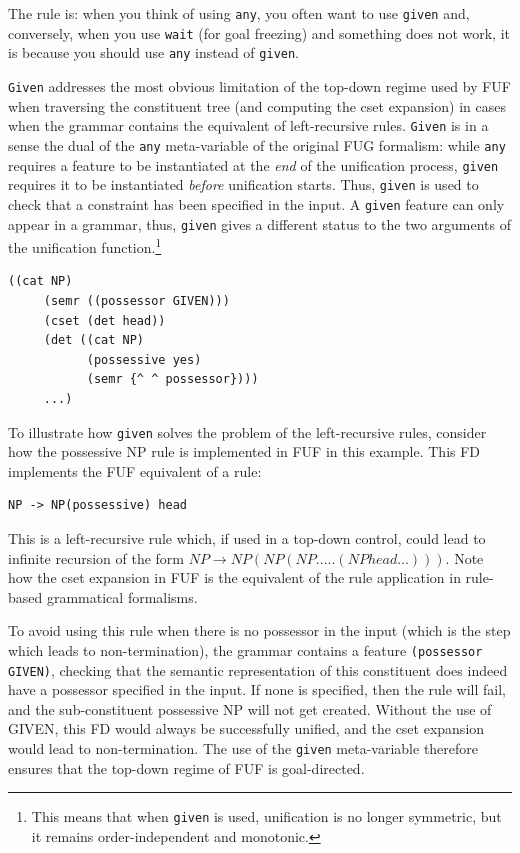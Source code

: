 \documentclass[10pt,a4paper]{report}
\begin{document}
The rule is: when you think of using {\tt any}, you often want to use
{\tt given} and, conversely, when you use {\tt wait} (for goal freezing) and
something does not work, it is because you should use {\tt any} instead of
{\tt given}.

{\tt Given} addresses the most obvious limitation of the top-down regime used
by FUF when traversing the constituent tree (and computing the cset
expansion) in cases when the grammar contains the equivalent of
left-recursive rules.  {\tt Given} is in a sense the dual of the {\tt any}
meta-variable of the original \textsc{FUG} formalism: while {\tt any} requires a
feature to be instantiated at the {\em end} of the unification process,
{\tt given} requires it to be instantiated {\em before} unification starts.
Thus, {\tt given} is used to check that a constraint has been specified in
the input.  A {\tt given} feature can only appear in a grammar, thus,
{\tt given} gives a different status to the two arguments of the unification
function.\footnote{This means that when {\tt given} is used, unification is no
longer symmetric, but it remains order-independent and monotonic.}

\begin{lstlisting}[language=Lisp]
	((cat NP)
	 (semr ((possessor GIVEN)))
	 (cset (det head))
	 (det ((cat NP)
	       (possessive yes)
	       (semr {^ ^ possessor})))
	 ...)
\end{lstlisting}

To illustrate how {\tt given} solves the problem of the left-recursive rules,
consider how the possessive NP rule is implemented in FUF in this example.
This FD implements the FUF equivalent of a rule:
\begin{lstlisting}[language=Lisp]
NP -> NP(possessive) head
\end{lstlisting}

This is a left-recursive rule which, if used in a top-down control, could
lead to infinite recursion of the form $NP \rightarrow NP (NP (NP ..... (NP head...)))$.
Note how the cset expansion in FUF is the equivalent of the rule application in rule-based grammatical formalisms.

To avoid using this rule when there is no possessor in the input (which is
the step which leads to non-termination), the grammar contains a feature
{\tt (possessor GIVEN)}, checking that the semantic representation of this
constituent does indeed have a possessor specified in the input.  If none
is specified, then the rule will fail, and the sub-constituent possessive
NP will not get created.  Without the use of GIVEN, this FD would always be
successfully unified, and the cset expansion would lead to non-termination.
The use of the {\tt given} meta-variable therefore ensures that the top-down
regime of FUF is goal-directed.
\end{document}
